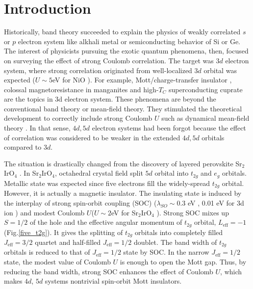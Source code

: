 \documentclass[a4,10.5pt]{report}
\begin{document}
\chapter{Introduction}
Historically, band theory succeeded to explain the physics of weakly correlated $s$ or $p$ electron system like alkhali metal or semiconducting behavior of Si or Ge.
The interest of physicists pursuing the exotic quantum phenomena, then, focused on surveying the effect of strong Coulomb correlation.
The target was $3d$ electron system, where strong correlation originated from well-localized $3d$ orbital was expected ($U \sim 5$eV for NiO \cite{bengone2000implementation}).
For example, Mott/charge-transfer insulator \cite{arima1993variation}, colossal magnetoresistance in manganites \cite{dagotto2005complexity} 
and high-$T_C$ superconducting cuprate \cite{dagotto2005complexity} are the topics in 3d electron system.
These phenomena are beyond the conventional band theory or mean-field theory.
They stimulated the theoretical development to correctly include strong Coulomb $U$ such as dynamical mean-field theory \cite{georges1996dynamical}.
In that sense, $4d, 5d$ electron systems had been forgot because the effect of correlation was considered to be weaker in the extended $4d, 5d$ orbitals compared to $3d$.


The situation is drastically changed from the discovery of layered perovskite Sr$_2$IrO$_4$ \cite{kim2008novel, kim2009phase}.
In Sr$_2$IrO$_4$, octahedral crystal field split $5d$ orbital into $t_{2g}$ and $e_g$ orbitals.
Metallic state was expected since five electrons fill the widely-spread $t_{2g}$ orbital.
However, it is actually a magnetic insulator.
The insulating state is induced by the interplay of strong spin-orbit coupling (SOC) ($\lambda_{SO} \sim 0.3$ eV \cite{kim2008novel}, 0.01 eV for 3d ion \cite{Kanamori})
and modest Coulomb $U$($U \sim 2$eV for Sr$_2$IrO$_4$ \cite{arita2012ab}).
Strong SOC mixes up $S = 1/2$ of the hole and the effective angular momentum of $t_{2g}$ orbital, $L_\mathrm{eff} = -1$ (Fig.\ref{five_t2g}).
It gives the splitting of $t_{2g}$ orbitals into completely filled $J_{\mathrm{eff}} = 3/2$ quartet and half-filled $J_{\mathrm{eff}} = 1/2$ doublet.
The band width of $t_{2g}$ orbitals is reduced to that of $J_{\mathrm{eff}} = 1/2$ state by SOC.
In the narrow $J_{\mathrm{eff}} = 1/2$ state, the modest value of Coulomb $U$ is enough to open the Mott gap.
Thus, by reducing the band width, strong SOC enhances the effect of Coulomb $U$, which makes $4d$, $5d$ systems nontrivial spin-orbit Mott insulators.
\end{document}
